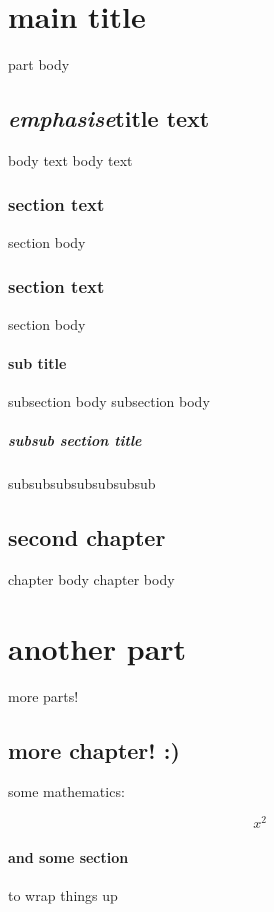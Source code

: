 \begin{myenv}
	\part{main title}

		part body

		\chapter{\emph{emphasise}title text}

		 body text body text

		 \section{section text}

		  section body

		 \section{section text}

		  section body

		  \subsection{sub title}

			  subsection body subsection body

			  \subsubsection{subsub section title}

				  subsubsubsubsubsubsub

		\chapter{second chapter}

		 chapter body chapter body

	\part{another part}

		more parts!

		\chapter{more chapter! :)}

		 some mathematics:

		 \[

			 x^2

		 \]

		 \subsection{and some section}

			 to wrap things up
\end{myenv}
